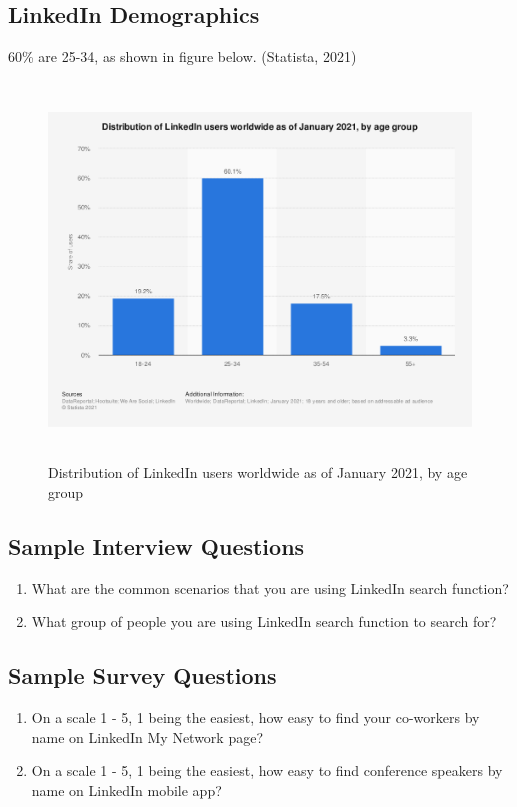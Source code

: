 \documentclass[
	letterpaper, %
]{jdf}
\begin{document}
\subsection{LinkedIn Demographics}
60\% are 25-34, as shown in figure below. (Statista, 2021)
\begin{figure}[h]
	\centering
	\includegraphics[height=10cm]{Figures/linkedin users.png}
	\caption{Distribution of LinkedIn users worldwide as of January 2021, by age group}
	\label{fig:linkedin_users}
\end{figure}


\subsection{Sample Interview Questions}
\begin{enumerate}
	\item What are the common scenarios that you are using LinkedIn search function?
	\item What group of people you are using LinkedIn search function to search for?
\end{enumerate}

\subsection{Sample Survey Questions}
\begin{enumerate}
	\item On a scale 1 - 5, 1 being the easiest, how easy to find your co-workers by name on LinkedIn My Network page?
	\item On a scale 1 - 5, 1 being the easiest, how easy to find conference speakers by name on LinkedIn mobile app?
\end{enumerate}
\end{document}
